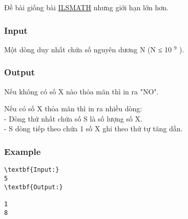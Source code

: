 

Đề bài giống bài \href{http://vnoi.info/problems/show/ILSMATH/}{ILSMATH} nhưng giới hạn lớn hơn.

\subsubsection{Input}

Một dòng duy nhất chứa số nguyên dương N (N ≤ 10 $^ 9 $ ).

\subsubsection{Output}

Nếu không có số X nào thỏa mãn thì in ra "NO".

Nếu có số X thỏa mãn thì in ra nhiều dòng:
\\- Dòng thứ nhất chứa số S là số lượng số X.
\\- S dòng tiếp theo chứa 1 số X ghi theo thứ tự tăng dần.

\subsubsection{Example}
\begin{verbatim}
\textbf{Input:}
5
\textbf{Output:}

1
8\end{verbatim}